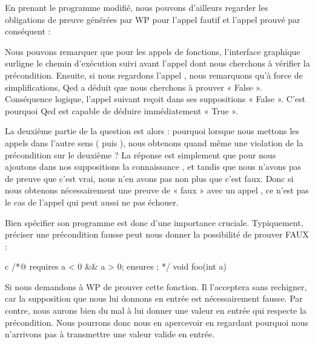 En prenant le programme modifié, nous pouvons d'ailleurs regarder les obligations
de preuve générées par WP pour l'appel fautif et l'appel prouvé par conséquent :







Nous pouvons remarquer que pour les appels de fonctions, l'interface graphique
surligne le chemin d'exécution suivi avant l'appel dont nous cherchons à 
vérifier la précondition. Ensuite, si nous regardons l'appel ,
nous remarquons qu'à force de simplifications, Qed a déduit que nous 
cherchons à prouver « False ». Conséquence logique, l'appel suivant  
reçoit dans ses suppositions « False ». C'est pourquoi Qed est capable de déduire
immédiatement « True ».



La deuxième partie de la question est alors : pourquoi lorsque nous mettons les 
appels dans l'autre sens ( puis ), nous obtenons 
quand même une violation de la précondition sur le deuxième ? La réponse est 
simplement que pour  nous ajoutons dans nos suppositions la
connaissance , et tandis que nous n'avons pas de preuve
que c'est vrai, nous n'en avons pas non plus que c'est faux. Donc si nous obtenons 
nécessairement une preuve de « faux » avec un appel , ce n'est
pas le cas de l'appel  qui peut aussi ne pas échouer.



Bien spécifier son programme est donc d'une importance cruciale. Typiquement, 
préciser une précondition fausse peut nous donner la possibilité de prouver 
FAUX :



\begin{CodeBlock}{c}
/*@
  requires a < 0 && a > 0;
  ensures  \false;
*/
void foo(int a){

}
\end{CodeBlock}



Si nous demandons à WP de prouver cette fonction. Il l'acceptera sans rechigner,
car la supposition que nous lui donnons en entrée est nécessairement fausse. Par
contre, nous aurons bien du mal à lui donner une valeur en entrée qui respecte la 
précondition. Nous pourrons donc nous en apercevoir en regardant pourquoi nous
n'arrivons pas à transmettre une valeur valide en entrée.



